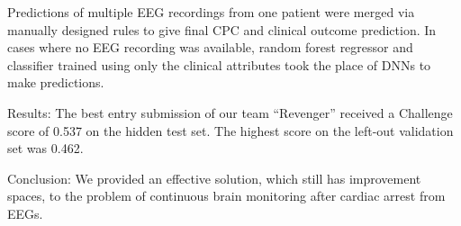\documentclass{cinc-abstract}
\begin{document}
Predictions of multiple EEG recordings from one patient were merged via manually designed rules to give final CPC and clinical outcome prediction. In cases where no EEG recording was available, random forest regressor and classifier trained using only the clinical attributes took the place of DNNs to make predictions.

Results: The best entry submission of our team ``Revenger'' received a Challenge score of 0.537 on the hidden test set. The highest score on the left-out validation set was 0.462.

Conclusion: We provided an effective solution, which still has improvement spaces, to the problem of continuous brain monitoring after cardiac arrest from EEGs.
\end{document}
